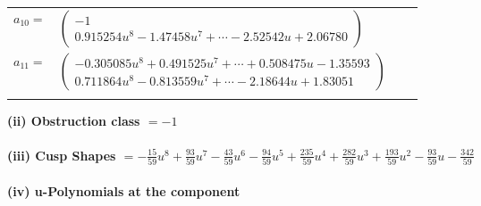 \documentclass[1p]{elsarticle_modified}
\theoremstyle{definition}
\begin{document}
\begin{tabular}{m{7pt} m{180pt} m{7pt} m{180pt} }
\flushright $a_{10}=$&$\begin{pmatrix}-1\\0.915254 u^{8}-1.47458 u^{7}+\cdots-2.52542 u+2.06780\end{pmatrix}$ \\
\flushright $a_{11}=$&$\begin{pmatrix}-0.305085 u^{8}+0.491525 u^{7}+\cdots+0.508475 u-1.35593\\0.711864 u^{8}-0.813559 u^{7}+\cdots-2.18644 u+1.83051\end{pmatrix}$\\&\end{tabular}
\flushleft \textbf{(ii) Obstruction class $= -1$}\\~\\
\flushleft \textbf{(iii) Cusp Shapes $= -\frac{15}{59} u^8+\frac{93}{59} u^7-\frac{43}{59} u^6-\frac{94}{59} u^5+\frac{235}{59} u^4+\frac{282}{59} u^3+\frac{193}{59} u^2-\frac{93}{59} u-\frac{342}{59}$}\\~\\
\newpage\renewcommand{\arraystretch}{1}
\flushleft \textbf{(iv) u-Polynomials at the component}\newline \\
\end{document}
